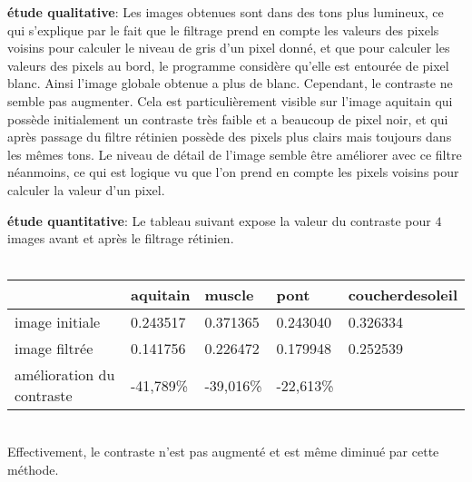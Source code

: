 \documentclass[12pt]{article}
\numberwithin{equation}{section}
\begin{document}
\textbf{étude qualitative}: Les images obtenues sont dans des tons plus lumineux, ce qui s'explique par le fait que le filtrage prend en compte les valeurs des pixels voisins pour calculer le niveau de gris d'un pixel donné, et que pour calculer les valeurs des pixels au bord, le programme considère qu'elle est entourée de pixel blanc. Ainsi l'image globale obtenue a plus de blanc. Cependant, le contraste ne semble pas augmenter. Cela est particulièrement visible sur l'image aquitain qui possède initialement un contraste très faible et a beaucoup de pixel noir, et qui après passage du filtre rétinien possède des pixels plus clairs mais toujours dans les mêmes tons. Le niveau de détail de l'image semble être améliorer avec ce filtre néanmoins, ce qui est logique vu que l'on prend en compte les pixels voisins pour calculer la valeur d'un pixel.

\textbf{étude quantitative}: Le tableau suivant expose la valeur du contraste pour $4$ images avant et après le filtrage rétinien.\\\\
\begin{center}
  \begin{tabular}{|l|l|l|l|l|}
    \hline
    & aquitain & muscle & pont & coucherdesoleil\\
    \hline
    image initiale & 0.243517 & 0.371365 & 0.243040 & 0.326334\\
    \hline
    image filtrée & 0.141756 & 0.226472 & 0.179948 & 0.252539 \\
    \hline
    amélioration du contraste & -41,789\% & -39,016\% & -22,613\% &\\
    \hline
  \end{tabular}
\end{center}
\\
Effectivement, le contraste n'est pas augmenté et est même diminué par cette méthode.
\end{document}
